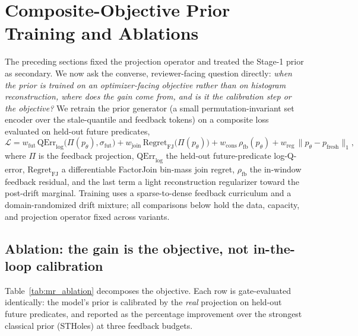 
\section{Composite-Objective Prior Training and Ablations}
\label{sec:mr-composite}

The preceding sections fixed the projection operator and treated the Stage-1
prior as secondary. We now ask the converse, reviewer-facing question directly:
\emph{when the prior is trained on an optimizer-facing objective rather than on
histogram reconstruction, where does the gain come from, and is it the
calibration step or the objective?} We retrain the prior generator (a small
permutation-invariant set encoder over the stale-quantile and feedback tokens) on
a composite loss evaluated on held-out future predicates,
\[
  \mathcal{L} = w_{\text{fut}}\,\mathrm{QErr}_{\log}\!\big(\Pi(p_\theta),\sigma_{\text{fut}}\big)
              + w_{\text{join}}\,\mathrm{Regret}_{\text{FJ}}\!\big(\Pi(p_\theta)\big)
              + w_{\text{cons}}\,\rho_{\text{fb}}(p_\theta)
              + w_{\text{reg}}\,\lVert p_\theta - p_{\text{fresh}}\rVert_1,
\]
where $\Pi$ is the feedback projection, $\mathrm{QErr}_{\log}$ the held-out
future-predicate log-Q-error, $\mathrm{Regret}_{\text{FJ}}$ a differentiable
FactorJoin bin-mass join regret, $\rho_{\text{fb}}$ the in-window feedback
residual, and the last term a light reconstruction regularizer toward the
post-drift marginal. Training uses a sparse-to-dense feedback curriculum and a
domain-randomized drift mixture; all comparisons below hold the data, capacity,
and projection operator fixed across variants.

\subsection{Ablation: the gain is the objective, not in-the-loop calibration}
\label{sec:mr-ablation}

Table~\ref{tab:mr_ablation} decomposes the objective. Each row is gate-evaluated
identically: the model's prior is calibrated by the \emph{real} projection on
held-out future predicates, and reported as the percentage improvement over the
strongest classical prior (STHoles) at three feedback budgets.

